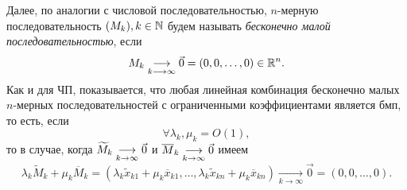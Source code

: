 \documentclass[../../main.tex]{subfiles}
\begin{document}
  Далее, по аналогии с числовой последовательностью, 
  $n$-мерную последовательность $(M_k),  k \in \mathbb{N} $
  будем называть \emph{бесконечно малой последовательностью}, если
  \[
    M_k \underset{k \longrightarrow \infty}
    {\longrightarrow}\vec{0} = (0,0,\dots,0) \in \mathbb{R}^n.
  \]
  Как и для ЧП, показывается, что любая линейная 
  комбинация бесконечно малых $n$-мерных последовательностей с 
  ограниченными коэффициентами является бмп, то есть, если
  \[
    \forall \lambda_k, \mu_{k} = O(1),
  \]
  то в случае, когда $\widetilde{M}_k \underset{k \to \infty}\longrightarrow\vec0$ и
  $\overline{M}_k \underset{k \to \infty}\longrightarrow\vec0$ имеем
  \[
    \lambda_k \widetilde{M}_k + \mu_k \overline{M}_k =
    (\lambda_k \widetilde{x}_{k1} + \mu_k \overline{x}_{k1}, 
    \dots,
    \lambda_k \widetilde{x}_{kn} + \mu_k \overline{x}_{kn}
    )
    \underset{k \longrightarrow \infty}{\longrightarrow}
    \vec{0} = (0,0,\dots,0).
  \]
\end{document}
